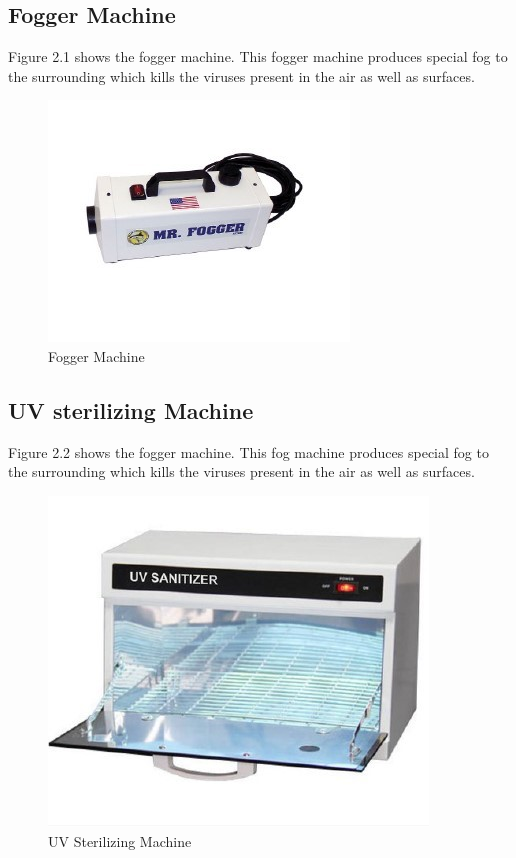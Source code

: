 \documentclass[a4paper,12pt]{report}
\begin{document}
\subsection{ Fogger Machine}
Figure 2.1 shows the fogger machine. This fogger machine produces special fog to the surrounding which kills the viruses present in the air as well as surfaces.
 \begin{figure}[h]  %
   \begin{center}
   \includegraphics[scale=0.7]{fogger.jpg}
   \caption{Fogger Machine}
  \end{center}
  \end{figure}
\subsection{ UV sterilizing Machine}
Figure 2.2 shows the fogger machine. This fog machine produces special fog to the surrounding which kills the viruses present in the air as well as surfaces.
 \begin{figure}[h]  %
   \begin{center}
   \includegraphics[scale=0.7]{uv machine.jpg}
   \caption{UV Sterilizing Machine}
   \end{center}
  \end{figure}
\end{document}
